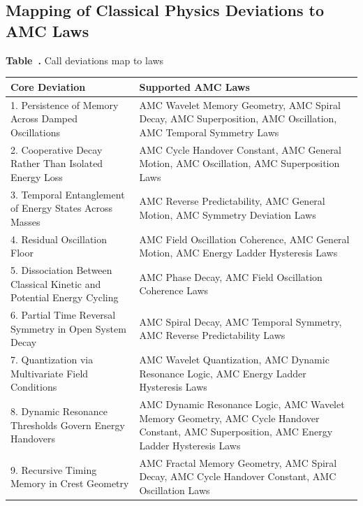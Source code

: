 \documentclass[10pt,aps,pre,onecolumn,superscriptaddress,notitlepage]{revtex4-2}
\begin{document}
\clearpage
\subsection{Mapping of Classical Physics Deviations to AMC Laws}
\label{sec:mapping}
\begin{center}
  \textbf{Table~\thetable.} Call deviations map to laws
  \label{tab:deviation_law_map}
  
  \vspace{0.5em} %

  \begin{tabular}{|p{5cm}|p{10cm}|}
    \hline
    \textbf{Core Deviation} & \textbf{Supported AMC Laws} \\
    \hline
    1. Persistence of Memory Across Damped Oscillations & AMC Wavelet Memory Geometry, AMC Spiral Decay, AMC Superposition, AMC Oscillation, AMC Temporal Symmetry Laws \\
    \hline
    2. Cooperative Decay Rather Than Isolated Energy Loss & AMC Cycle Handover Constant, AMC General Motion, AMC Oscillation, AMC Superposition Laws \\
    \hline
    3. Temporal Entanglement of Energy States Across Masses & AMC Reverse Predictability, AMC General Motion, AMC Symmetry Deviation Laws \\
    \hline
    4. Residual Oscillation Floor & AMC Field Oscillation Coherence, AMC General Motion, AMC Energy Ladder Hysteresis Laws \\
    \hline
    5. Dissociation Between Classical Kinetic and Potential Energy Cycling & AMC Phase Decay, AMC Field Oscillation Coherence Laws \\
    \hline
    6. Partial Time Reversal Symmetry in Open System Decay & AMC Spiral Decay, AMC Temporal Symmetry, AMC Reverse Predictability Laws \\
    \hline
    7. Quantization via Multivariate Field Conditions & AMC Wavelet Quantization, AMC Dynamic Resonance Logic, AMC Energy Ladder Hysteresis Laws \\
    \hline
    8. Dynamic Resonance Thresholds Govern Energy Handovers & AMC Dynamic Resonance Logic, AMC Wavelet Memory Geometry, AMC Cycle Handover Constant, AMC Superposition, AMC Energy Ladder Hysteresis Laws \\
    \hline
    9. Recursive Timing Memory in Crest Geometry & AMC Fractal Memory Geometry, AMC Spiral Decay, AMC Cycle Handover Constant, AMC Oscillation Laws \\

\end{tabular}
\end{center}
\end{document}
